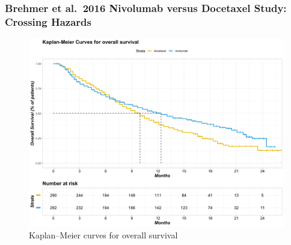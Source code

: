 \documentclass[12pt,twoside]{reedthesis}
\begin{document}
\hypertarget{brehmer-et-al.-2016-nivolumab-versus-docetaxel-study-crossing-hazards}{%
\subsubsection{Brehmer et al.~2016 Nivolumab versus Docetaxel Study: Crossing Hazards}\label{brehmer-et-al.-2016-nivolumab-versus-docetaxel-study-crossing-hazards}}
\begin{figure}

{\centering \includegraphics[scale=0.55]{figure/brehmer} 

}

\caption{Kaplan–Meier curves for overall survival}\label{fig:unnamed-chunk-5}
\end{figure}
\clearpage
\end{document}
